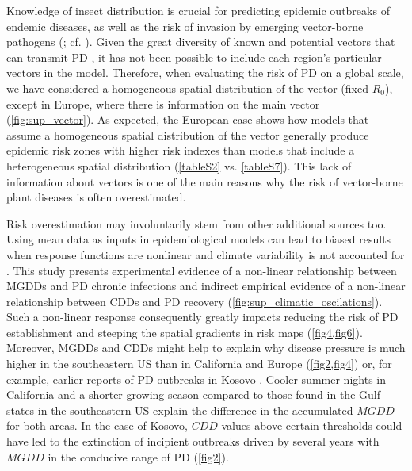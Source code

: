     Knowledge of insect distribution is crucial for predicting epidemic
    outbreaks of endemic diseases, as well as the risk of invasion by emerging
    vector-borne pathogens (\cite {Caminade2017,Jeger2019}; cf.
    \cite{Schneider2020}). Given the great diversity of known and potential
    vectors that can transmit PD \cite{Redak2004}, it has not been possible to
    include each region's particular vectors in the model. Therefore, when
    evaluating the risk of PD on a global scale, we have considered a
    homogeneous spatial distribution of the vector (fixed $ R_0 $), except in
    Europe, where there is information on the main vector
    (\cref{fig:sup_vector}). As expected, the European case shows how models
    that assume a homogeneous spatial distribution of the vector generally
    produce epidemic risk zones with higher risk indexes than models that
    include a heterogeneous spatial distribution (\cref{tableS2} vs.
    \cref{tableS7}). This lack of information about vectors is one of the main
    reasons why the risk of vector-borne plant diseases is often overestimated.

    Risk overestimation may involuntarily stem from other additional sources
    too. Using mean data as inputs in epidemiological models can lead to biased
    results when response functions are nonlinear and climate variability is
    not accounted for \cite{Scherm1994}. This study presents experimental
    evidence of a non-linear relationship between MGDDs and PD chronic
    infections and indirect empirical evidence of a non-linear relationship
    between CDDs and PD recovery (\cref{fig:sup_climatic_oscilations}). Such a
    non-linear response consequently greatly impacts reducing the risk of PD
    establishment and steeping the spatial gradients in risk maps
    (\cref{fig4,fig6}). Moreover, MGDDs and CDDs might help to explain why
    disease pressure is much higher in the southeastern US than in California
    and Europe (\cref{fig2,fig4}) or, for example, earlier reports of PD
    outbreaks in Kosovo  \cite{Berisha1998}. Cooler summer nights in California
    and a shorter growing season compared to those found in the Gulf states in
    the southeastern US explain the difference in the accumulated $MGDD$ for
    both areas. In the case of Kosovo, $CDD$ values above certain thresholds
    could have led to the extinction of incipient outbreaks driven by several
    years with $MGDD$ in the conducive range of PD (\cref{fig2}).

